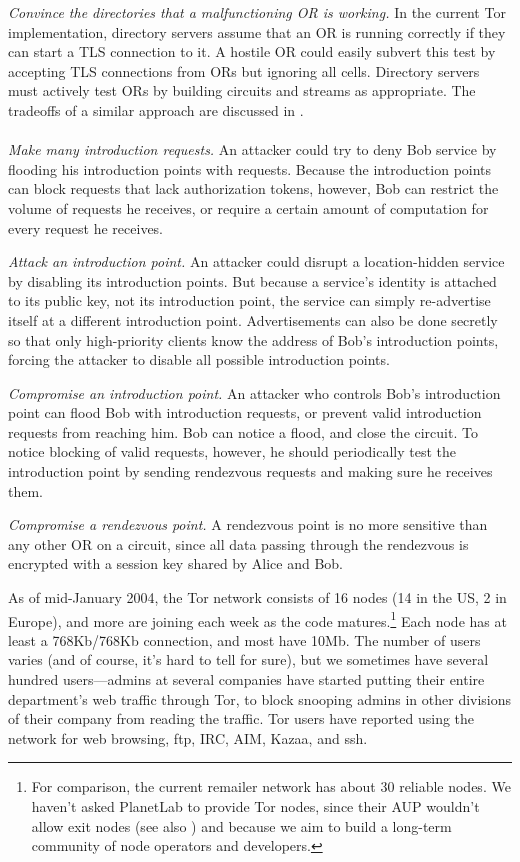 \documentclass[times,10pt,twocolumn]{article}
\begin{document}
\emph{Convince the directories that a malfunctioning OR is
working.}  In the current Tor implementation, directory servers
assume that an OR is running correctly if they can start a TLS
connection to it.  A hostile OR could easily subvert this test by
accepting TLS connections from ORs but ignoring all cells. Directory
servers must actively test ORs by building circuits and streams as
appropriate.  The tradeoffs of a similar approach are discussed in
\cite{mix-acc}.\\

\\
\emph{Make many introduction requests.}  An attacker could
try to deny Bob service by flooding his introduction points with
requests.  Because the introduction points can block requests that
lack authorization tokens, however, Bob can restrict the volume of
requests he receives, or require a certain amount of computation for
every request he receives.

\emph{Attack an introduction point.} An attacker could
disrupt a location-hidden service by disabling its introduction
points.  But because a service's identity is attached to its public
key, not its introduction point, the service can simply re-advertise
itself at a different introduction point. Advertisements can also be
done secretly so that only high-priority clients know the address of
Bob's introduction points, forcing the attacker to disable all possible
introduction points.

\emph{Compromise an introduction point.} An attacker who controls
Bob's introduction point can flood Bob with
introduction requests, or prevent valid introduction requests from
reaching him. Bob can notice a flood, and close the circuit.  To notice
blocking of valid requests, however, he should periodically test the
introduction point by sending rendezvous requests and making
sure he receives them.

\emph{Compromise a rendezvous point.}  A rendezvous
point is no more sensitive than any other OR on
a circuit, since all data passing through the rendezvous is encrypted
with a session key shared by Alice and Bob.

\label{sec:in-the-wild}

As of mid-January 2004, the Tor network consists of 16 nodes
(14 in the US, 2 in Europe), and more are joining each week as the code
matures.\footnote{For comparison, the current remailer network
has about 30 reliable nodes. We haven't asked PlanetLab to provide
Tor nodes, since their AUP wouldn't allow exit nodes (see also
\cite{darkside}) and because we aim to build a long-term community of
node operators and developers.} Each node has at least a 768Kb/768Kb
connection, and
most have 10Mb. The number of users varies (and of course, it's hard to
tell for sure), but we sometimes have several hundred users---admins at
several companies have started putting their entire department's web
traffic through Tor, to block snooping admins in other divisions of
their company from reading the traffic. Tor users have reported using
the network for web browsing, ftp, IRC, AIM, Kazaa, and ssh.
\end{document}
